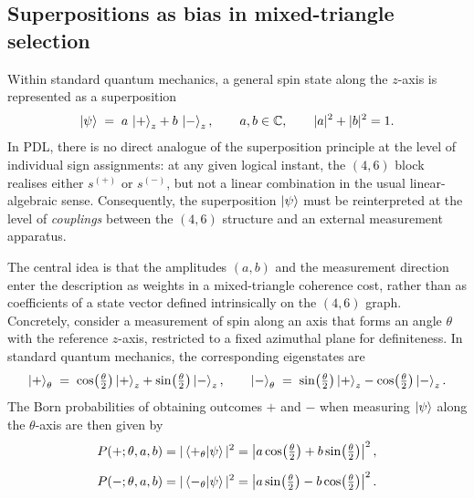 \documentclass[11pt,a4paper]{article}
\numberwithin{equation}{section}
\begin{document}
\subsection{Superpositions as bias in mixed-triangle selection}

Within standard quantum mechanics, a general spin state along the $z$-axis is represented as a superposition
\begin{equation}
  \ket{\psi} \;=\; a\,\ket{+}_z + b\,\ket{-}_z,
  \qquad
  a,b\in\mathbb{C},
  \qquad
  |a|^2+|b|^2=1.
\end{equation}
In PDL, there is no direct analogue of the superposition principle at the level of individual sign assignments: at any given logical instant, the $(4,6)$ block realises either $s^{(+)}$ or $s^{(-)}$, but not a linear combination in the usual linear-algebraic sense. Consequently, the superposition $\ket{\psi}$ must be reinterpreted at the level of \emph{couplings} between the $(4,6)$ structure and an external measurement apparatus.

The central idea is that the amplitudes $(a,b)$ and the measurement direction enter the description as weights in a mixed-triangle coherence cost, rather than as coefficients of a state vector defined intrinsically on the $(4,6)$ graph. Concretely, consider a measurement of spin along an axis that forms an angle $\theta$ with the reference $z$-axis, restricted to a fixed azimuthal plane for definiteness. In standard quantum mechanics, the corresponding eigenstates are
\begin{equation}
  \ket{+}_\theta \;=\; \cos\!\left(\tfrac{\theta}{2}\right)\ket{+}_z + \sin\!\left(\tfrac{\theta}{2}\right)\ket{-}_z,
  \qquad
  \ket{-}_\theta \;=\; \sin\!\left(\tfrac{\theta}{2}\right)\ket{+}_z - \cos\!\left(\tfrac{\theta}{2}\right)\ket{-}_z.
\end{equation}
The Born probabilities of obtaining outcomes $+$ and $-$ when measuring $\ket{\psi}$ along the $\theta$-axis are then given by
\begin{align}
  P(+;\theta,a,b) &= |\braket{+_\theta}{\psi}|^2
  = \left|a\cos\!\left(\tfrac{\theta}{2}\right) + b\sin\!\left(\tfrac{\theta}{2}\right)\right|^2,
  \label{eq:Born_plus_standard}\\[0.5em]
  P(-;\theta,a,b) &= |\braket{-_\theta}{\psi}|^2
  = \left|a\sin\!\left(\tfrac{\theta}{2}\right) - b\cos\!\left(\tfrac{\theta}{2}\right)\right|^2.
  \label{eq:Born_minus_standard}
\end{align}
\end{document}

